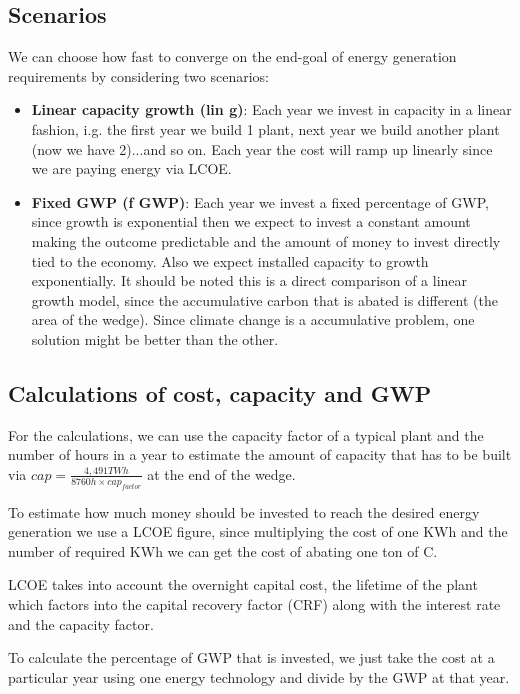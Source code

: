 \documentclass[11pt]{article}
\begin{document}
\subsection{Scenarios}

We can choose how fast to converge on the end-goal of energy generation requirements by considering two scenarios:

\begin{itemize}
\item \textbf{Linear capacity growth (lin g)}: Each year we invest in capacity in a linear fashion, i.g. the first year we build 1 plant, next year we build another plant (now we have 2)...and so on. Each year the cost will ramp up linearly since we are paying energy via LCOE.
\item \textbf{Fixed GWP (f GWP)}: Each year we invest a fixed percentage of GWP, since growth is exponential then we expect to invest a constant amount making the outcome predictable and the amount of money to invest directly tied to the economy. Also we expect installed capacity to growth exponentially. It should be noted this is a direct comparison of a linear growth model, since the accumulative carbon that is abated is different (the area of the wedge). Since climate change is a accumulative problem, one solution might be better than the other.
\end{itemize}


\subsection{Calculations of cost, capacity and GWP}

For the calculations, we can use the capacity factor of a typical plant and the number of hours in a year to estimate the amount of capacity that has to be built via $cap=\frac{4,491 TWh}{8760 h\times {cap}_{factor}}$ at the end of the wedge.

To estimate how much money should be invested to reach the desired energy generation we use a LCOE figure, since multiplying the cost of one KWh and the number of required KWh we can get the cost of abating one ton of C.

LCOE takes into account the overnight capital cost, the lifetime of the plant which factors into the capital recovery factor (CRF) along with the interest rate and the capacity factor. 

To calculate the percentage of GWP that is invested, we just take the cost at a particular year using one energy technology and divide by the GWP at that year.
\end{document}
